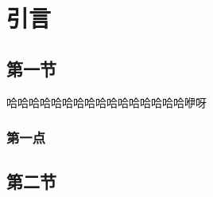 \section{引言}
\subsection{第一节}
哈哈哈哈哈哈哈哈哈哈哈哈哈哈哈哈咿呀
\subsubsection{第一点}
\lipsum[1-2]
\subsection{第二节}
\lipsum[1-2]